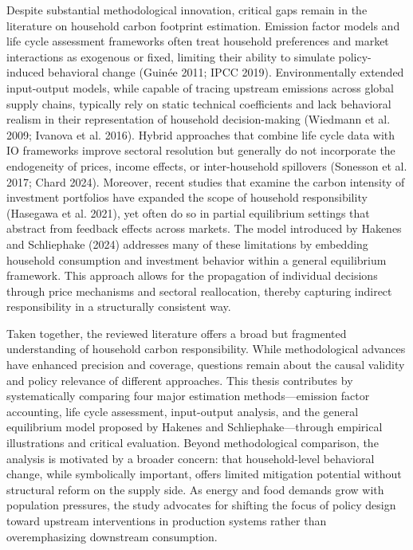 \documentclass[12pt,a4paper]{article}%
\begin{document}
Despite substantial methodological innovation, critical gaps remain in the literature on household carbon footprint estimation. Emission factor models and life cycle assessment frameworks often treat household preferences and market interactions as exogenous or fixed, limiting their ability to simulate policy-induced behavioral change (Guinée 2011; IPCC 2019). Environmentally extended input-output models, while capable of tracing upstream emissions across global supply chains, typically rely on static technical coefficients and lack behavioral realism in their representation of household decision-making (Wiedmann et al. 2009; Ivanova et al. 2016). Hybrid approaches that combine life cycle data with IO frameworks improve sectoral resolution but generally do not incorporate the endogeneity of prices, income effects, or inter-household spillovers (Sonesson et al. 2017; Chard 2024). Moreover, recent studies that examine the carbon intensity of investment portfolios have expanded the scope of household responsibility (Hasegawa et al. 2021), yet often do so in partial equilibrium settings that abstract from feedback effects across markets. The model introduced by Hakenes and Schliephake (2024) addresses many of these limitations by embedding household consumption and investment behavior within a general equilibrium framework. This approach allows for the propagation of individual decisions through price mechanisms and sectoral reallocation, thereby capturing indirect responsibility in a structurally consistent way.

Taken together, the reviewed literature offers a broad but fragmented understanding of household carbon responsibility. While methodological advances have enhanced precision and coverage, questions remain about the causal validity and policy relevance of different approaches. This thesis contributes by systematically comparing four major estimation methods—emission factor accounting, life cycle assessment, input-output analysis, and the general equilibrium model proposed by Hakenes and Schliephake—through empirical illustrations and critical evaluation. Beyond methodological comparison, the analysis is motivated by a broader concern: that household-level behavioral change, while symbolically important, offers limited mitigation potential without structural reform on the supply side. As energy and food demands grow with population pressures, the study advocates for shifting the focus of policy design toward upstream interventions in production systems rather than overemphasizing downstream consumption.
\end{document}
